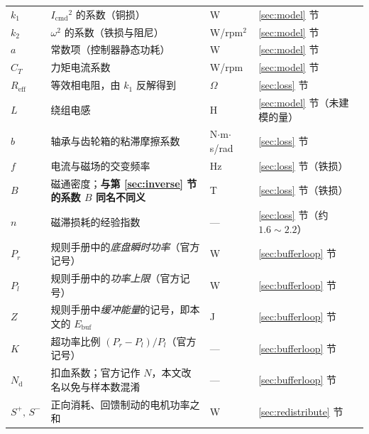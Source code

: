 \documentclass[cn,blue,11pt,device=normal]{elegantnote}
\newcommand{\Icmd}{I_{\mathrm{cmd}}{}}
\newcommand{\CT}{C_{T}{}}
\newcommand{\Ebuf}{E_{\mathrm{buf}}{}}
\begin{document}
\begin{table}[htbp]
\begin{tabular}{@{}>{\raggedright\arraybackslash}p{}>{\raggedright\arraybackslash}p{}>{\raggedright\arraybackslash}p{}>{\raggedright\arraybackslash}p{}@{}}
    $k_1$             & $\Icmd^{2}$ 的系数（铜损） & W & \ref{sec:model} 节 \\
    $k_2$             & $\omega^{2}$ 的系数（铁损与阻尼） & W/rpm$^{2}$ & \ref{sec:model} 节 \\
    $a$               & 常数项（控制器静态功耗） & W & \ref{sec:model} 节 \\
    $\CT$             & 力矩电流系数 & W/rpm & \ref{sec:model} 节 \\
    $R_{\mathrm{eff}}$ & 等效相电阻，由 $k_1$ 反解得到 & $\Omega$ & \ref{sec:loss} 节 \\
    $L$               & 绕组电感 & H & \ref{sec:model} 节（未建模的量） \\
    $b$               & 轴承与齿轮箱的粘滞摩擦系数 & N$\cdot$m$\cdot$s/rad & \ref{sec:loss} 节 \\
    $f$               & 电流与磁场的交变频率 & Hz & \ref{sec:loss} 节（铁损） \\
    $B$               & 磁通密度；\textbf{与第 \ref{sec:inverse} 节的系数 $B$ 同名不同义} & T & \ref{sec:loss} 节（铁损） \\
    $n$               & 磁滞损耗的经验指数 & — & \ref{sec:loss} 节（约 $1.6\sim2.2$） \\
    \midrule
    $P_r$             & 规则手册中的\emph{底盘瞬时功率}（官方记号） & W & \ref{sec:bufferloop} 节 \\
    $P_l$             & 规则手册中的\emph{功率上限}（官方记号） & W & \ref{sec:bufferloop} 节 \\
    $Z$               & 规则手册中\emph{缓冲能量}的记号，即本文的 $\Ebuf$ & J & \ref{sec:bufferloop} 节 \\
    $K$               & 超功率比例 $(P_r-P_l)/P_l$（官方记号） & — & \ref{sec:bufferloop} 节 \\
    $N_{\mathrm{d}}$  & 扣血系数；官方记作 $N$，本文改名以免与样本数混淆 & — & \ref{sec:bufferloop} 节 \\
    $S^{+},\,S^{-}$   & 正向消耗、回馈制动的电机功率之和 & W & \ref{sec:redistribute} 节 \\
    \bottomrule
  \end{tabular}
\end{table}
\end{document}
